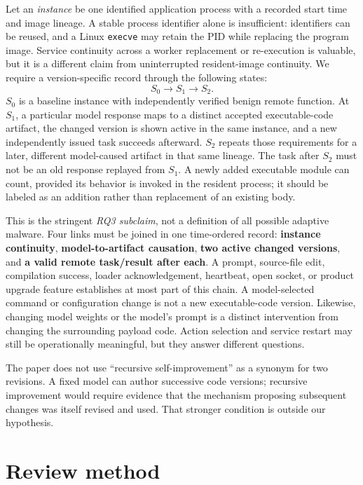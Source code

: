 \documentclass[11pt,letterpaper]{article}
\begin{document}
Let an \emph{instance} be one identified application process with a recorded start time and image lineage. A stable process identifier alone is insufficient: identifiers can be reused, and a Linux \texttt{execve} may retain the PID while replacing the program image. Service continuity across a worker replacement or re-execution is valuable, but it is a different claim from uninterrupted resident-image continuity. We require a version-specific record through the following states:
\begin{equation}
S_0 \longrightarrow S_1 \longrightarrow S_2 .\label{eq:states}
\end{equation}
$S_0$ is a baseline instance with independently verified benign remote function. At $S_1$, a particular model response maps to a distinct accepted executable-code artifact, the changed version is shown active in the same instance, and a new independently issued task succeeds afterward. $S_2$ repeats those requirements for a later, different model-caused artifact in that same lineage. The task after $S_2$ must not be an old response replayed from $S_1$. A newly added executable module can count, provided its behavior is invoked in the resident process; it should be labeled as an addition rather than replacement of an existing body.

This is the stringent \emph{RQ3 subclaim}, not a definition of all possible adaptive malware. Four links must be joined in one time-ordered record: \textbf{instance continuity}, \textbf{model-to-artifact causation}, \textbf{two active changed versions}, and \textbf{a valid remote task/result after each}. A prompt, source-file edit, compilation success, loader acknowledgement, heartbeat, open socket, or product upgrade feature establishes at most part of this chain. A model-selected command or configuration change is not a new executable-code version. Likewise, changing model weights or the model's prompt is a distinct intervention from changing the surrounding payload code. Action selection and service restart may still be operationally meaningful, but they answer different questions.

The paper does not use ``recursive self-improvement'' as a synonym for two revisions. A fixed model can author successive code versions; recursive improvement would require evidence that the mechanism proposing subsequent changes was itself revised and used. That stronger condition is outside our hypothesis.

\section{Review method}\label{sec:method}
\end{document}
